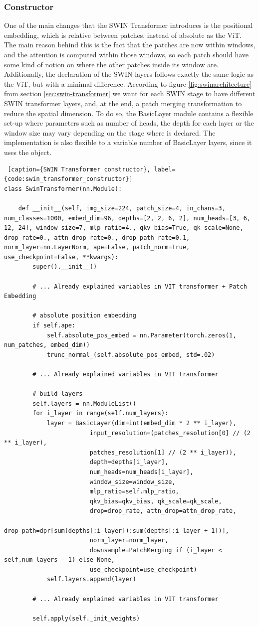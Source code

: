 \subsubsection{Constructor}
One of the main changes that the SWIN Transformer introduces is the positional embedding, which is relative between patches, instead of absolute as the ViT. The main reason behind this is the fact that the patches are now within windows, and the attention is computed within those windows, so each patch should have some kind of notion on where the other patches inside its window are. Additionally, the declaration of the SWIN layers follows exactly the same logic as the ViT, but with a minimal difference. According to figure \ref{fig:swinarchitecture} from section \ref{sec:swin-transformer} we want for each SWIN stage to have different SWIN transformer layers, and, at the end, a patch merging transformation to reduce the spatial dimension. To do so, the BasicLayer module contains a flexible set-up where parameters such as number of heads, the depth for each layer or the window size may vary depending on the stage where is declared. The implementation is also flexible to a variable number of BasicLayer layers, since it uses the  object.

\begin{lstlisting} [caption={SWIN Transformer constructor}, label={code:swin_transformer_constructor}]
class SwinTransformer(nn.Module):
	
	def __init__(self, img_size=224, patch_size=4, in_chans=3, num_classes=1000, embed_dim=96, depths=[2, 2, 6, 2], num_heads=[3, 6, 12, 24], window_size=7, mlp_ratio=4., qkv_bias=True, qk_scale=None, drop_rate=0., attn_drop_rate=0., drop_path_rate=0.1,	norm_layer=nn.LayerNorm, ape=False, patch_norm=True, use_checkpoint=False, **kwargs):
		super().__init__()
		
		# ... Already explained variables in VIT transformer + Patch Embedding
		
		# absolute position embedding
		if self.ape:
			self.absolute_pos_embed = nn.Parameter(torch.zeros(1, num_patches, embed_dim))
			trunc_normal_(self.absolute_pos_embed, std=.02)
		
		# ... Already explained variables in VIT transformer
		
		# build layers
		self.layers = nn.ModuleList()
		for i_layer in range(self.num_layers):
			layer = BasicLayer(dim=int(embed_dim * 2 ** i_layer),
						input_resolution=(patches_resolution[0] // (2 ** i_layer),
						patches_resolution[1] // (2 ** i_layer)),
						depth=depths[i_layer],
						num_heads=num_heads[i_layer],
						window_size=window_size,
						mlp_ratio=self.mlp_ratio,
						qkv_bias=qkv_bias, qk_scale=qk_scale,
						drop=drop_rate, attn_drop=attn_drop_rate,
						drop_path=dpr[sum(depths[:i_layer]):sum(depths[:i_layer + 1])],
						norm_layer=norm_layer,
						downsample=PatchMerging if (i_layer < self.num_layers - 1) else None,
						use_checkpoint=use_checkpoint)
			self.layers.append(layer)
			
		# ... Already explained variables in VIT transformer
		
		self.apply(self._init_weights)
\end{lstlisting}

